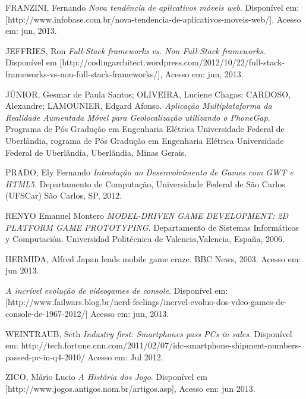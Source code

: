 \documentclass{article}
\begin{document}
\begin{thebibliography}{99}
 FRANZINI, Fernando 
 \emph{Nova tendência de aplicativos móveis web}.  Disponível em:
[http://www.infobase.com.br/nova-tendencia-de-aplicativos-moveis-web/]. Acesso em: jun,
2013.

JEFFRIES, Ron 
\emph{Full-Stack frameworks vs. Non Full-Stack frameworks}.
Disponível em [http://codingarchitect.wordpress.com/2012/10/22/full-stack-frameworks-vs-non-full-stack-frameworks/], Acesso em: jun, 2013.


JÚNIOR, Gesmar de Paula Santos; OLIVEIRA, Luciene Chagas; CARDOSO, Alexandre; LAMOUNIER, Edgard Afonso.
\emph{Aplicação Multiplataforma da Realidade Aumentada Móvel para Geolocalização utilizando o PhoneGap}.
Programa de Pós Gradução em Engenharia Elétrica
Universidade Federal de Uberlândia, rograma de Pós Gradução em Engenharia Elétrica
Universidade Federal de Uberlândia, Uberlândia, Minas Gerais.



PRADO, Ely Fernando
\emph{Introdução ao Desenvolvimento de Games com GWT e HTML5}. 
Departamento de Computação, Universidade Federal de São Carlos (UFSCar) São Carlos, SP, 2012.


RENYO Emanuel Montero 
\emph{MODEL-DRIVEN GAME DEVELOPMENT: 2D PLATFORM GAME PROTOTYPING}. 
Departamento de Sistemas Informáticos y Computación. Universidad Politécnica de Valencia,Valencia, España, 2006.



HERMIDA, Alfred 
Japan leads mobile game craze. BBC News, 2003. Acesso em: jun 2013.

\emph{A incrível evolução de videogames de console}. 
Disponível em: [http://www.failwars.blog.br/nerd-feelings/incrvel-evoluo-dos-vdeo-games-de-console-de-1967-2012/] Acesso em: jun, 2013.

WEINTRAUB, Seth
  \emph{Industry first: Smartphones pass PCs in sales}.
Disponível em: http://tech.fortune.cnn.com/2011/02/07/idc-smartphone-shipment-numbers-passed-pc-in-q4-2010/
Acesso em: Jul 2012.

ZICO, Mário Lucio 
\emph{A História dos Jogo}. 
Disponível em [http://www.jogos.antigos.nom.br/artigos.asp], Acesso em: jun 2013.



\end{thebibliography}

\printindex[not]

\printindex[list]

\printindex
\end{document}
